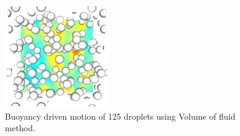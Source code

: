 \documentclass{icnmmf5}
\begin{document}
\begin{figure}[b]
  \begin{center}
   \includegraphics[height=4.5cm]{image/3D/P_PHI_5.png}
  \end{center}
  \caption{Buoyancy driven motion of 125 droplets using Volume of fluid method.}%
  \label{fig:tower}
\end{figure}

\end{document}
